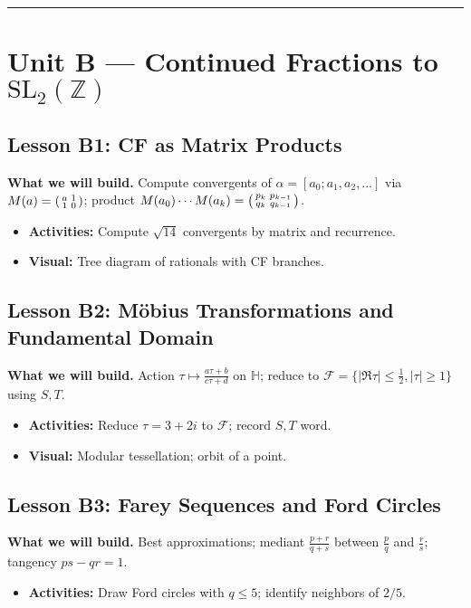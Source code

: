 \documentclass[11pt]{article}
\begin{document}
\bigskip
\hrule
\bigskip

\section*{Unit B --- Continued Fractions to \texorpdfstring{$\mathrm{SL}_2(\mathbb{Z})$}{SL2(Z)}}
\subsection*{Lesson B1: CF as Matrix Products}
\textbf{What we will build.} Compute convergents of $\alpha=[a_0;a_1,a_2,\dots]$ via $M(a)=\begin{psmallmatrix}a&1\\1&0\end{psmallmatrix}$; product $M(a_0)\cdots M(a_k)=\begin{psmallmatrix}p_k&p_{k-1}\\ q_k&q_{k-1}\end{psmallmatrix}$.
\begin{itemize}
\item \textbf{Activities:} Compute $\sqrt{14}$ convergents by matrix and recurrence.
\item \textbf{Visual:} Tree diagram of rationals with CF branches.
\end{itemize}

\subsection*{Lesson B2: Möbius Transformations and Fundamental Domain}
\textbf{What we will build.} Action $\tau\mapsto\frac{a\tau+b}{c\tau+d}$ on $\mathbb{H}$; reduce to $\mathcal{F}=\{|\Re\tau|\le\tfrac12,|\tau|\ge1\}$ using $S,T$.
\begin{itemize}
\item \textbf{Activities:} Reduce $\tau=3+2i$ to $\mathcal{F}$; record $S,T$ word.
\item \textbf{Visual:} Modular tessellation; orbit of a point.
\end{itemize}

\subsection*{Lesson B3: Farey Sequences and Ford Circles}
\textbf{What we will build.} Best approximations; mediant $\frac{p+r}{q+s}$ between $\frac{p}{q}$ and $\frac{r}{s}$; tangency $ps-qr=1$.
\begin{itemize}
\item \textbf{Activities:} Draw Ford circles with $q\le5$; identify neighbors of $2/5$.
\end{itemize}
\end{document}
